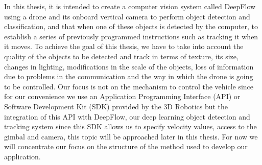 In this thesis, it is intended to create a computer vision system called DeepFlow using a drone and its onboard vertical camera to perform object detection and classification, and that when one of these objects is detected by the computer, to establish a series of previously programmed instructions such as tracking it when it moves. To achieve the goal of this thesis, we have to take into account the quality of the objects to be detected and track in terms of texture, its size, changes in lighting, modifications in the scale of the objects, loss of information due to problems in the communication and the way in which the drone is going to be controlled. Our focus is not on the mechanism to control  the vehicle since for our convenience we use an Application Programming Interface (API) or Software Development Kit (SDK) provided by the 3D Robotics but the integration of this API with DeepFlow, our deep learning object detection and tracking system since this SDK  allows us to specify velocity values, access to the gimbal and camera, this topic will be approached later in this thesis. For now we will concentrate our focus on the structure of the method used to develop our application.




